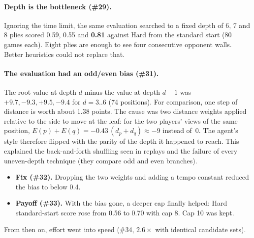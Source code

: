 \paragraph{Depth is the bottleneck (\#29).}
Ignoring the time limit, the same evaluation searched to a fixed depth of 6, 7 and 8 plies scored
0.59, 0.55 and \textbf{0.81} against Hard from the standard start (80 games each). Eight plies are
enough to see four consecutive opponent walls. Better heuristics could not replace that.

\paragraph{The evaluation had an odd/even bias (\#31).}
The root value at depth $d$ minus the value at depth $d-1$ was $+9.7, -9.3, +9.5, -9.4$ for
$d = 3..6$ (74 positions). For comparison, one step of distance is worth about 1.38 points.
The cause was two distance weights applied relative to the side to move at the leaf: for the two
players' views of the same position, $E(p) + E(q) = -0.43\,(d_p + d_q) \approx -9$ instead of~0.
The agent's style therefore flipped with the parity of the depth it happened to reach. This
explained the back-and-forth shuffling seen in replays and the failure of every uneven-depth
technique (they compare odd and even branches).
\begin{itemize}
  \item \textbf{Fix (\#32).} Dropping the two weights and adding a tempo constant reduced the bias
        to below 0.4.
  \item \textbf{Payoff (\#33).} With the bias gone, a deeper cap finally helped: Hard
        standard-start score rose from 0.56 to 0.70 with cap 8. Cap 10 was kept.
\end{itemize}
From then on, effort went into speed (\#34, $2.6\times$ with identical candidate sets).

